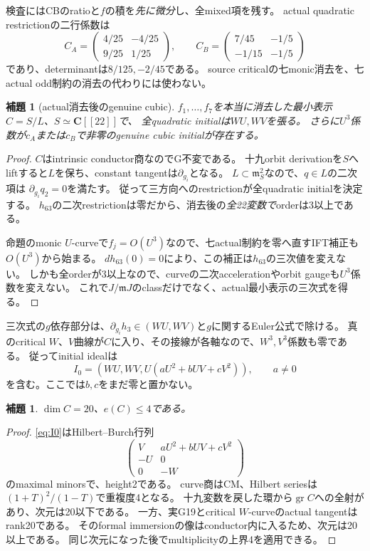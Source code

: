 \documentclass[11pt,a4paper]{ltjsarticle}
\newcommand{\CC}{\mathbf C}
\newcommand{\gr}{\operatorname{gr}}
\newtheorem{lemma}[theorem]{補題}
\theoremstyle{definition}
\theoremstyle{remark}
\begin{document}
検査にはCBのratioと$f$の積を\emph{先に微分}し、全mixed項を残す。
actual quadratic restrictionの二行係数は
\[
 C_A=\begin{pmatrix}4/25&-4/25\\9/25&1/25\end{pmatrix},\qquad
 C_B=\begin{pmatrix}7/45&-1/5\\-1/15&-1/5\end{pmatrix}
\]
であり、determinantは$8/125,-2/45$である。
source criticalの七monic消去を、七actual odd制約の消去の代わりには使わない。

\begin{lemma}[actual消去後のgenuine cubic]\label{lem:cubic}
$f_1,\ldots,f_7$を本当に消去した最小表示$C=S/L$、$S\simeq\CC[[22]]$で、
全quadratic initialは$WU,WV$を張る。
さらに$U^3$係数が$c_A$または$c_B$で非零のgenuine cubic initialが存在する。
\end{lemma}
\begin{proof}
$C$はintrinsic conductor商なのでG不変である。
十九orbit derivationを$S$へliftすると$L$を保ち、constant tangentは$\partial_{g_i}$となる。
$L\subset\mathfrak m_S^2$なので、$q\in L$の二次項は
$\partial_{g_i}q_2=0$を満たす。
従って三方向へのrestrictionが全quadratic initialを決定する。
$h_{63}$の二次restrictionは零だから、消去後の\emph{全22変数で}orderは3以上である。

命題のmonic $U$-curveで$f_j=O(U^3)$なので、七actual制約を零へ直すIFT補正も$O(U^3)$から始まる。
$dh_{63}(0)=0$により、この補正は$h_{63}$の三次値を変えない。
しかも全orderが3以上なので、curveの二次accelerationやorbit gaugeも$U^3$係数を変えない。
これで$J/\mathfrak mJ$のclassだけでなく、actual最小表示の三次式を得る。
\end{proof}

三次式の$g$依存部分は、$\partial_{g_i}h_3\in(WU,WV)$と$g$に関するEuler公式で除ける。
真のcritical $W$、$V$曲線が$C$に入り、その接線が各軸なので、$W^3,V^3$係数も零である。
従ってinitial idealは
\begin{equation}\label{eq:I0}
 I_0=(WU,WV,U(aU^2+bUV+cV^2)),\qquad a\ne0
\end{equation}
を含む。ここでは$b,c$をまだ零と置かない。

\begin{lemma}
$\dim C=20$、$e(C)\le4$である。
\end{lemma}
\begin{proof}
\eqref{eq:I0}はHilbert--Burch行列
\[
 \begin{pmatrix}V&aU^2+bUV+cV^2\\-U&0\\0&-W\end{pmatrix}
\]
のmaximal minorsで、height2である。
curve商はCM、Hilbert seriesは$(1+T)^2/(1-T)$で重複度4となる。
十九変数を戻した環から$\gr C$への全射があり、次元は20以下である。
一方、実G19とcritical $W$-curveのactual tangentはrank20である。
そのformal immersionの像はconductor内に入るため、次元は20以上である。
同じ次元になった後でmultiplicityの上界4を適用できる。
\end{proof}
\end{document}
